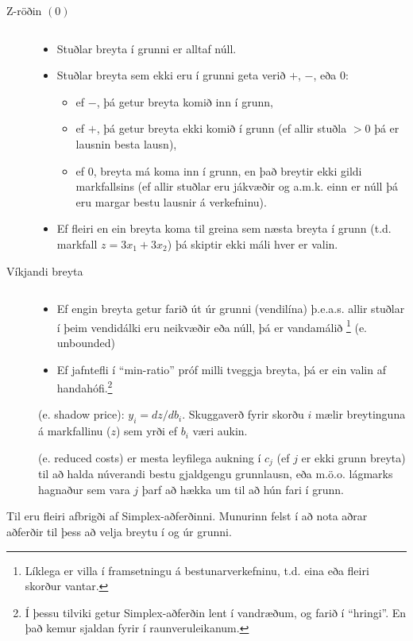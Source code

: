 \begin{description}
 \item[Z-röðin $(0)$]\begin{verbatim}\end{verbatim}
\begin{itemize}
\item Stuðlar breyta í grunni er alltaf núll.
\item Stuðlar breyta sem ekki eru í grunni geta verið $+$, $-$,
  eða $0$:
\begin{itemize}
\item ef $-$, þá getur breyta komið inn í grunn,
\item ef $+$, þá getur breyta ekki komið í grunn (ef allir stuðla $>0$ þá er
lausnin besta lausn),
\item ef $0$, breyta má koma inn í grunn, en það breytir ekki gildi
markfallsins (ef allir stuðlar eru jákvæðir og a.m.k. einn er núll þá eru
margar bestu lausnir á verkefninu).
\end{itemize}
\item Ef fleiri en ein breyta koma til greina sem næsta breyta í grunn (t.d. markfall $z=3x_1+3x_2$) þá skiptir ekki máli hver er valin.
\end{itemize}
\item[Víkjandi breyta]\begin{verbatim}\end{verbatim}
\begin{itemize}
\item Ef engin breyta getur farið út úr grunni (vendilína) þ.e.a.s. allir stuðlar í þeim vendidálki eru neikvæðir eða núll, þá er vandamálið \footnote{Líklega er villa í framsetningu á bestunarverkefninu, t.d. eina eða fleiri skorður vantar.} (e. unbounded)
\item Ef jafntefli í ``min-ratio'' próf milli tveggja breyta, þá er ein valin af handahófi.\footnote{Í þessu tilviki getur Simplex-aðferðin lent í vand\-ræðum, og farið í ``hringi''. En það kemur sjaldan fyrir í raunveruleikanum.}
\end{itemize}
\item[] (e. shadow price): $y_i = dz / db_i$.
  Skuggaverð fyrir skorðu $i$ mælir breytinguna á markfallinu
  ($z$) sem yrði ef $b_i$ væri aukin.
\item[] (e. reduced costs) er mesta leyfilega
  aukning í $c_j$ (ef $j$ er ekki grunn breyta) til að halda
  núverandi bestu gjaldgengu grunnlausn, eða m.ö.o. lágmarks hagnaður sem vara $j$ þarf að hækka um til að hún fari í grunn.
\end{description}
\begin{aths}
 Til eru fleiri afbrigði af Simplex-aðferðinni. Munurinn felst í að nota aðrar aðferðir til þess að velja breytu í og úr grunni.
\end{aths}
